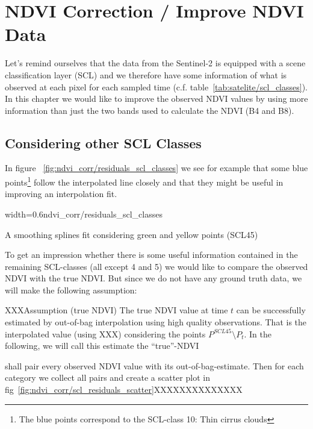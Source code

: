 \chapter{NDVI Correction / Improve NDVI Data}

{
    Let's remind ourselves that the data from the Sentinel-2 is equipped with a scene classification layer (SCL) and we therefore have some information of what is observed at each pixel for each sampled time (c.f. table~\ref{tab:satelite/scl_classes}). In this chapter we would like to improve the observed NDVI values by using more information than just the two bands used to calculate the NDVI (B4 and B8).
}

\section{Considering other SCL Classes}{
    In figure ~\ref{fig:ndvi_corr/residuals_scl_classes} we see for example that some blue points\footnote{The blue points correspond to the SCL-class 10: Thin cirrus clouds} follow the interpolated line closely and that they might be useful in improving an interpolation fit.

    \begin{my_figure}[ht]{width=0.6\textwidth}{ndvi_corr/residuals_scl_classes}
        \caption{A smoothing splines fit considering green and yellow points (SCL45)}
        \label{fig:ndvi_corr/residuals_scl_classes}
    \end{my_figure}

    To get an impression whether there is some useful information contained in the remaining SCL-classes (all except 4 and 5) we would like to compare the observed NDVI with the true NDVI. But since we do not have any ground truth data, we will make the following assumption:


    \begin{definition}{XXXAssumption (true NDVI)}
        The true NDVI value at time $t$ can be successfully estimated by out-of-bag interpolation using high quality observations. That is the interpolated value (using XXX) considering the points $P^{SCL45}\setminus P_t$. In the following, we will call this estimate the ``true''-NDVI
    \end{definition}

    shall pair every observed NDVI value with its out-of-bag-estimate. Then for each category we collect all pairs and create a scatter plot in fig~\ref{fig:ndvi_corr/scl_residuals_scatter}XXXXXXXXXXXXXX



}
